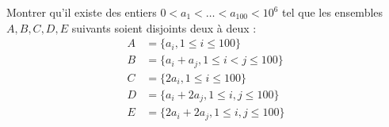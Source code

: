 Montrer qu'il existe des entiers $0 < a_1 < \dots < a_{100} < 10^6$ tel que les ensembles $A, B, C, D, E$ suivants soient disjoints deux à deux :
\begin{align*}
A & = \{a_i, 1\le i\le 100\} \\
B & = \{a_i + a_j, 1\le i < j\le 100\} \\
C & = \{2a_i, 1\le i\le 100\} \\
D & = \{a_i + 2a_j, 1\le i, j\le 100\} \\
E & = \{2a_i + 2a_j, 1\le i, j\le 100\}
\end{align*}